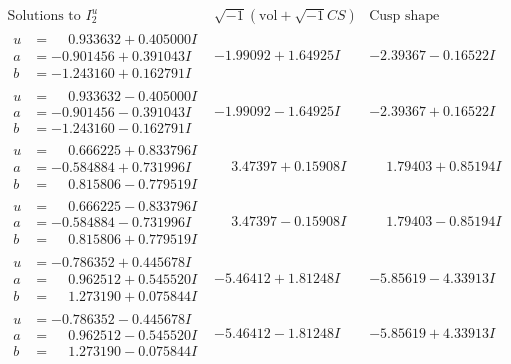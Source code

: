 \documentclass[1p]{elsarticle_modified}
\theoremstyle{definition}
\newcommand{\I}{\sqrt{-1}}
\begin{document}
$$\begin{array}{c|c|c}  
\text{Solutions to }I^u_{2}& \I (\text{vol} + \sqrt{-1}CS) & \text{Cusp shape}\\
 \hline 
\begin{aligned}
u &= \phantom{-}0.933632 + 0.405000 I \\
a &= -0.901456 + 0.391043 I \\
b &= -1.243160 + 0.162791 I\end{aligned}
 & -1.99092 + 1.64925 I & -2.39367 - 0.16522 I \\ \hline\begin{aligned}
u &= \phantom{-}0.933632 - 0.405000 I \\
a &= -0.901456 - 0.391043 I \\
b &= -1.243160 - 0.162791 I\end{aligned}
 & -1.99092 - 1.64925 I & -2.39367 + 0.16522 I \\ \hline\begin{aligned}
u &= \phantom{-}0.666225 + 0.833796 I \\
a &= -0.584884 + 0.731996 I \\
b &= \phantom{-}0.815806 - 0.779519 I\end{aligned}
 & \phantom{-}3.47397 + 0.15908 I & \phantom{-}1.79403 + 0.85194 I \\ \hline\begin{aligned}
u &= \phantom{-}0.666225 - 0.833796 I \\
a &= -0.584884 - 0.731996 I \\
b &= \phantom{-}0.815806 + 0.779519 I\end{aligned}
 & \phantom{-}3.47397 - 0.15908 I & \phantom{-}1.79403 - 0.85194 I \\ \hline\begin{aligned}
u &= -0.786352 + 0.445678 I \\
a &= \phantom{-}0.962512 + 0.545520 I \\
b &= \phantom{-}1.273190 + 0.075844 I\end{aligned}
 & -5.46412 + 1.81248 I & -5.85619 - 4.33913 I \\ \hline\begin{aligned}
u &= -0.786352 - 0.445678 I \\
a &= \phantom{-}0.962512 - 0.545520 I \\
b &= \phantom{-}1.273190 - 0.075844 I\end{aligned}
 & -5.46412 - 1.81248 I & -5.85619 + 4.33913 I \\ \hline\begin{aligned}

\end{aligned}
\end{array}$$
\end{document}
